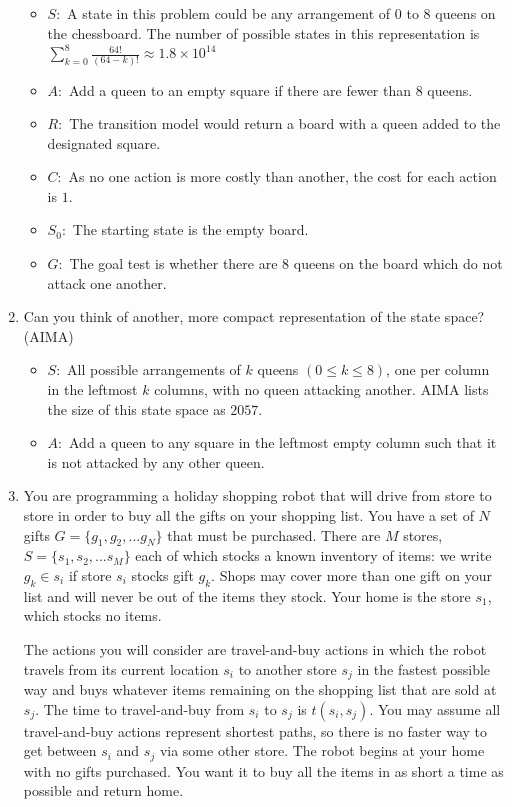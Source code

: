 \documentclass[11pt]{article}
\begin{document}
\begin{enumerate}
\begin{itemize}
\color{blue}
\item $S:$ A state in this problem could be any arrangement of $0$ to $8$
queens on the chessboard. The number of possible states in this representation
is $\sum_{k=0}^8 \frac{64!}{(64-k)!} \approx 1.8 \times 10^{14}$
\item $A:$ Add a queen to an empty square if there are
fewer than $8$ queens.
\item $R:$ The transition model would return a board with a queen
added to the designated square.
\item $C:$ As no one action is more costly than another, the cost for each
action is $1$.
\item $S_0:$ The starting state is the empty board.
\item $G:$ The goal test is whether there are $8$ queens on the board
which do not attack one another.
\end{itemize}

\item Can you think of another, more compact representation of the state space? (AIMA)
\begin{itemize}
\color{blue}
\item $S:$ All possible arrangements of $k$ queens $(0 \le k \le 8)$,
one per column in the leftmost $k$ columns, with no queen attacking another.
AIMA lists the size of this state space as $2057$.
\item $A:$ Add a queen to any square in the leftmost empty column such that
it is not attacked by any other queen.
\end{itemize}

\newpage
\item
You are programming a holiday shopping robot that will drive from store to
store in order to buy all the gifts on your shopping list.  You have a set
of $N$ gifts $G = \{ g_1 ,g_2 ,...g_N \}$ that must be purchased.  There are
$M$ stores, $S = \{ s_1 ,s_2 ,...s_M \}$ each of which stocks a known inventory
of items:  we write $g_k \in s_i$ if store $s_i$ stocks gift $g_k$. Shops may
cover more than one gift on your list and will never be out of the items they
stock.  Your home is the store $s_1$, which stocks no items.

The actions you will consider are travel-and-buy actions
in which the robot travels from its current location $s_i$ to another
store $s_j$ in the fastest possible way and buys whatever items remaining on
the shopping list that are sold at $s_j$.  The time to travel-and-buy from
$s_i$ to $s_j$ is $t(s_i,s_j)$.  You may assume all travel-and-buy actions
represent shortest paths, so there is no faster way to get between
$s_i$ and $s_j$ via some other store.  The robot begins at your home with no
gifts purchased.  You want it to buy all the items in as short a time as
possible and return home.


\end{enumerate}
\end{document}
